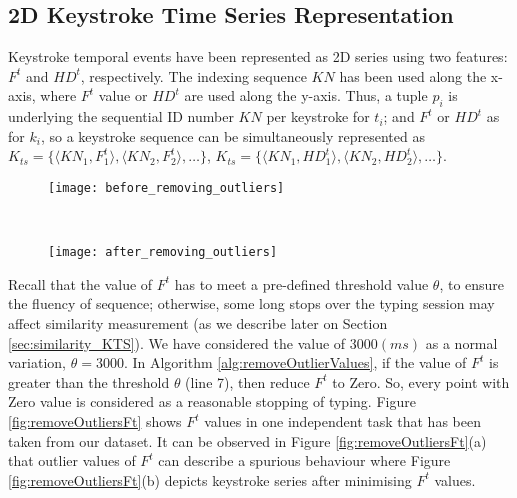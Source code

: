 \documentclass[runningheads,a4paper]{llncs}
\begin{document}
\subsection{2D Keystroke Time Series Representation} \label{subsec:2d_representation}
Keystroke temporal events have been represented as 2D series using two features: $F^t$ and $HD^t$, respectively. The indexing sequence $KN$ has been used along the x-axis, where $F^t$ value or $HD^t$ are used along the y-axis. Thus, a tuple $p_i$ is underlying the sequential ID number $KN$ per keystroke for $t_i$; and $F^t$ or $HD^t$ as for $k_i$, so a keystroke sequence can be simultaneously represented as $K_{ts} = \{\langle KN_1,F^t_1 \rangle, \langle KN_2,F^t_2 \rangle, \dots \}$, $K_{ts} = \{\langle KN_1,HD^t_1 \rangle, \langle KN_2,HD^t_2 \rangle, \dots \}$.
\begin{figure*}
    \centering
    \begin{subfigure}{0.4\textwidth}%
        \texttt{[image: before\_removing\_outliers]}
        \caption{}
        \label{fig:before}
    \end{subfigure}\hfill
    ~ %
    \begin{subfigure}{0.4\textwidth}
        \texttt{[image: after\_removing\_outliers]}
        \caption{}
        \label{fig:after}
    \end{subfigure}
    \caption{Keystroke time series before removing outlier values of $F^t$ \textbf{(a)}; and keytroke time series after removing outlier values of $F^t$ \textbf{(b)}.}\label{fig:removeOutliersFt}
\end{figure*}

\noindent Recall that the value of $F^t$ has to meet a pre-defined threshold value $\theta$, to ensure the fluency of sequence; otherwise, some long stops over the typing session may affect similarity measurement (as we describe later on Section \ref{sec:similarity_KTS}). We have considered the value of $3000 (ms)$ as a normal variation, $\theta=3000$. In Algorithm \ref{alg:removeOutlierValues}, if the value of $F^t$ is greater than the threshold $\theta$ (line 7), then reduce $F^t$ to Zero. So, every point with Zero value is considered as a reasonable stopping of typing. Figure \ref{fig:removeOutliersFt} shows $F^t$ values in one independent task that has been taken from our dataset. It can be observed in Figure \ref{fig:removeOutliersFt}(a) that outlier values of $F^t$ can describe a spurious behaviour where Figure \ref{fig:removeOutliersFt}(b) depicts keystroke series after minimising $F^t$ values.  
\end{document}
